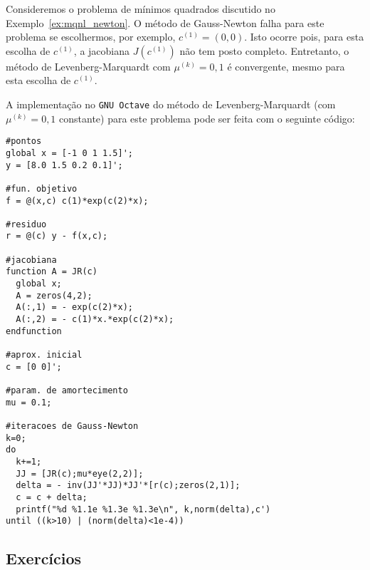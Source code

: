 \begin{ex}\label{ex:mqnl_LM}
  Consideremos o problema de mínimos quadrados discutido no Exemplo~\ref{ex:mqnl_newton}. O método de Gauss-Newton falha para este problema se escolhermos, por exemplo, $c^{(1)} = (0, 0)$. Isto ocorre pois, para esta escolha de $c^{(1)}$, a jacobiana $J(c^{(1)})$ não tem posto completo. Entretanto, o método de Levenberg-Marquardt com $\mu^{(k)} = 0,1$ é convergente, mesmo para esta escolha de $c^{(1)}$.

\ifisoctave
A implementação no \verb+GNU Octave+ do método de Levenberg-Marquardt (com $\mu^{(k)}=0,1$ constante) para este problema pode ser feita com o seguinte código:
\begin{verbatim}
#pontos
global x = [-1 0 1 1.5]';
y = [8.0 1.5 0.2 0.1]';

#fun. objetivo
f = @(x,c) c(1)*exp(c(2)*x);

#residuo
r = @(c) y - f(x,c);

#jacobiana
function A = JR(c)
  global x;
  A = zeros(4,2);
  A(:,1) = - exp(c(2)*x);
  A(:,2) = - c(1)*x.*exp(c(2)*x);
endfunction

#aprox. inicial
c = [0 0]';

#param. de amortecimento
mu = 0.1;

#iteracoes de Gauss-Newton
k=0;
do
  k+=1;
  JJ = [JR(c);mu*eye(2,2)];
  delta = - inv(JJ'*JJ)*JJ'*[r(c);zeros(2,1)];
  c = c + delta;
  printf("%d %1.1e %1.3e %1.3e\n", k,norm(delta),c')
until ((k>10) | (norm(delta)<1e-4))
\end{verbatim}
\fi
\end{ex}

\subsection*{Exercícios}

